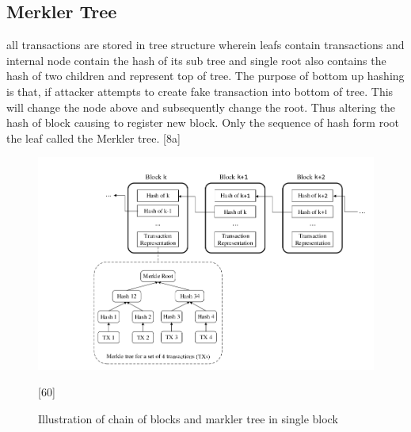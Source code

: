 \subsection{Merkler Tree}
all transactions are stored in tree structure wherein leafs contain transactions and internal node contain the hash of its sub tree and single root also contains the hash of two children  and represent top of tree. The purpose of bottom up hashing is that, if attacker attempts to create fake transaction into bottom of tree. This will change the node above and subsequently change the root. Thus altering the hash of block causing to register new block. Only the sequence of hash form root the leaf called the Merkler tree. [8a]   
\begin{center}
	\begin{figure}[htb!]
		
		\begin{minipage}{0.55\linewidth}
			\centering
			\includegraphics[width=1.85\textwidth]{images/chap01_Markler_tree.png}
		\end{minipage}
		\caption{Illustration of chain of blocks and  markler tree in single block}{[60]}
		
		
	\end{figure}
	
\end{center}

